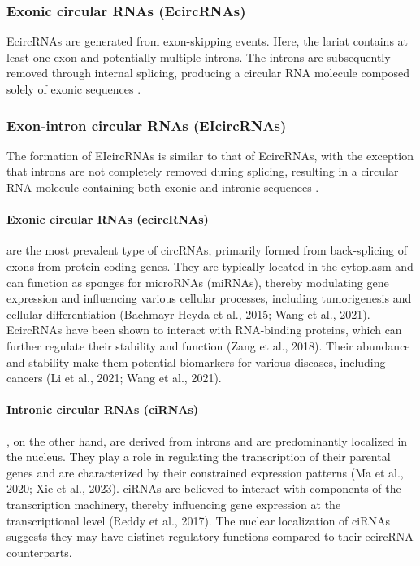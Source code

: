     \subsubsection{Exonic circular RNAs (EcircRNAs)}
    EcircRNAs are generated from exon-skipping events.
    Here, the lariat contains at least one exon and potentially multiple introns.
    The introns are subsequently removed through internal splicing, producing a
    circular RNA molecule composed solely of exonic sequences
    \supercite{xiao_circular_2022, li_biogenesis_2018}.

    \subsubsection{Exon-intron circular RNAs (EIcircRNAs)}
    The formation of EIcircRNAs is similar to that of EcircRNAs, with the exception
    that introns are not completely removed during splicing, resulting in a
    circular RNA molecule containing both exonic and intronic sequences
    \supercite{xiao_circular_2022}.
\fi

\paragraph{Exonic circular RNAs (ecircRNAs)} are the most prevalent type of
circRNAs, primarily formed from back-splicing of exons from protein-coding
genes.
They are typically located in the cytoplasm and can function as sponges for
microRNAs (miRNAs), thereby modulating gene expression and influencing various
cellular processes, including tumorigenesis and cellular differentiation
(Bachmayr-Heyda et al., 2015; Wang et al., 2021).
EcircRNAs have been shown to interact with RNA-binding proteins, which can
further regulate their stability and function (Zang et al., 2018).
Their abundance and stability make them potential biomarkers for various
diseases, including cancers (Li et al., 2021; Wang et al., 2021).

\paragraph{Intronic circular RNAs (ciRNAs)}, on the other hand, are derived
from introns
and are predominantly localized in the nucleus.
They play a role in regulating the transcription of their parental genes and
are characterized by their constrained expression patterns (Ma et al., 2020;
Xie et al., 2023).
ciRNAs are
believed to interact with components of the transcription machinery, thereby
influencing gene expression at the transcriptional level (Reddy et al., 2017).
The nuclear localization of ciRNAs suggests they may have distinct regulatory
functions compared to their ecircRNA counterparts.

